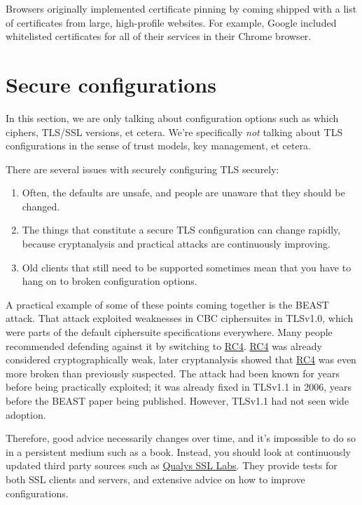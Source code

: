 \documentclass[11pt,ebook,table,dvipsnames]{memoir}
\begin{document}
Browsers originally implemented certificate pinning by coming shipped
with a list of certificates from large, high-profile websites. For
example, Google included whitelisted certificates for all of their
services in their Chrome browser.
\section{Secure configurations}
\label{sec-3-1-11}

In this section, we are only talking about configuration options such
as which ciphers, TLS/SSL versions, et cetera. We're specifically
\emph{not} talking about TLS configurations in the sense of trust models,
key management, et cetera.

There are several issues with securely configuring TLS securely:

\begin{enumerate}
\item Often, the defaults are unsafe, and people are unaware that they
should be changed.
\item The things that constitute a secure TLS configuration can change
rapidly, because cryptanalysis and practical attacks are
continuously improving.
\item Old clients that still need to be supported sometimes mean that you
have to hang on to broken configuration options.
\end{enumerate}

A practical example of some of these points coming together is the
BEAST attack. That attack exploited weaknesses in CBC ciphersuites in
TLSv1.0, which were parts of the default ciphersuite specifications
everywhere. Many people recommended defending against it by switching
to \hyperref[RC4]{RC4}. \hyperref[RC4]{RC4} was already considered cryptographically weak, later
cryptanalysis showed that \hyperref[RC4]{RC4} was even more broken than previously
suspected. The attack had been known for years before being
practically exploited; it was already fixed in TLSv1.1 in 2006, years
before the BEAST paper being published. However, TLSv1.1 had not seen
wide adoption.

Therefore, good advice necessarily changes over time, and it's
impossible to do so in a persistent medium such as a book. Instead,
you should look at continuously updated third party sources such as
\href{https://www.ssllabs.com/}{Qualys SSL Labs}. They provide tests for both SSL clients and servers,
and extensive advice on how to improve configurations.
\end{document}
